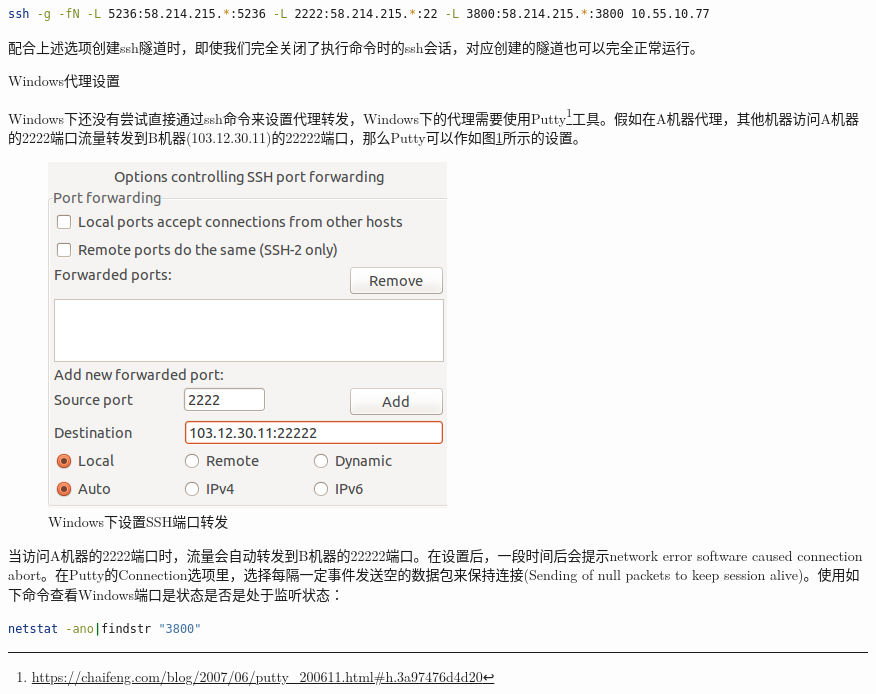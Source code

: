\documentclass[12pt]{book}
\makeatletter
\numberwithin{dummy}{section}
\theoremstyle{ocrenumbox}
\theoremstyle{blacknumex}
\theoremstyle{blacknumbox}
\theoremstyle{ocrenum}
\renewcommand\paragraph{\@startsection{paragraph}{4}{\z@}
	{-2ex \@plus-.2ex \@minus .2ex}
	{.1ex}
	{\normalfont\small\sffamily\bfseries}}
\makeatother
\begin{document}
\begin{lstlisting}[language=Bash]
ssh -g -fN -L 5236:58.214.215.*:5236 -L 2222:58.214.215.*:22 -L 3800:58.214.215.*:3800 10.55.10.77
\end{lstlisting}

配合上述选项创建ssh隧道时，即使我们完全关闭了执行命令时的ssh会话，对应创建的隧道也可以完全正常运行。

\paragraph{Windows代理设置}

Windows下还没有尝试直接通过ssh命令来设置代理转发，Windows下的代理需要使用Putty\footnote{\url{https://chaifeng.com/blog/2007/06/putty\_200611.html\#h.3a97476d4d20}}工具。假如在A机器代理，其他机器访问A机器的2222端口流量转发到B机器(103.12.30.11)的22222端口，那么Putty可以作如图\ref{fig:puttyportforwarding}所示的设置。

\begin{figure}[htbp]
	\centering
	\includegraphics[scale=0.6]{puttyportforwarding.png}
	\caption{Windows下设置SSH端口转发}
	\label{fig:puttyportforwarding}
\end{figure}

当访问A机器的2222端口时，流量会自动转发到B机器的22222端口。在设置后，一段时间后会提示network error software caused connection abort。在Putty的Connection选项里，选择每隔一定事件发送空的数据包来保持连接(Sending of null packets to keep session alive)。使用如下命令查看Windows端口是状态是否是处于监听状态：

\begin{lstlisting}[language=Bash]
netstat -ano|findstr "3800"
\end{lstlisting}
\end{document}
